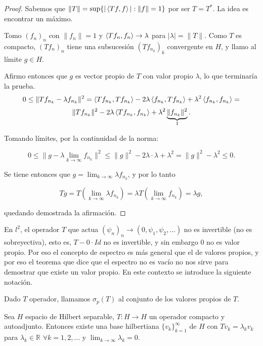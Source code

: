 \begin{proof}
  Sabemos que $\|T\|=\sup \{|\left\langle Tf,f\right\rangle|:\|f\|=1\}$ por ser $T=T^*$. La
  idea es encontrar un máximo.

  Tomo $(f_n)_n$ con $\|f_n\|=1$ y $\left\langle Tf_n,f_n\right\rangle\to \lambda$ para
  $|\lambda|=\|T\|$. Como $T$ es compacto, $(Tf_n)_n$ tiene una subsucesión
  $(Tf_{n_k})_k$ convergente en $H$, y llamo al límite $g\in H$.

  Afirmo entonces que $g$ es vector propio de $T$ con valor propio $\lambda$, lo
  que terminaría la prueba.
  \[
  0\le \|Tf_{n_k}-\lambda f_{n_k}\|^2 =
  \left\langle Tf_{n_k},Tf_{n_k}\right\rangle-2\lambda\left\langle f_{n_k},Tf_{n_k}\right\rangle+\lambda^2
  \left\langle f_{n_k},f_{n_k}\right\rangle=
  \] 
  \[
  \|Tf_{n_k}\|^2-2\lambda\left\langle Tf_{n_k},f_{n_k}\right\rangle + \lambda^2
  \underbrace{\|f_{n_k}\|^2}_{1}
  .\] 

  Tomando límites, por la continuidad de la norma:

  \[
  0\le \|g-\lambda \lim_{k \to \infty} f_{n_k}\|^2 \le 
  \|g\|^2-2\lambda\cdot \lambda + \lambda^2 =
  \|g\|^2 - \lambda^2 \le 0
  .\] 
  
  Se tiene entonces que $g=\lim_{k \to \infty} \lambda f_{n_k}$, y por lo tanto

  \[
  Tg = T(\lim_{k \to \infty} \lambda f_{n_k})=\lambda T(\lim_{k \to \infty}
  f_{n_k})=\lambda g
  ,\] 

  quedando demostrada la afirmación.

\end{proof}

\begin{remark}
  En $l^2$, el operador $T$ que actua $(\psi_n)_n\to (0,\psi_1,\psi_2,\ldots)$
  no es invertible (no es sobreyectiva), esto es, $T-0\cdot Id$ no es
  invertible, y sin embargo $0$ no es valor propio. Por eso el concepto de
  espectro es más general que el de valores propios, y por eso el teorema que
  dice que el espectro no es vacío no nos sirve para demostrar que existe un
  valor propio. En este contexto se introduce la siguiente notación.
\end{remark}

\begin{definition}
  Dado $T$ operador, llamamos $\sigma_p(T)$ al conjunto de los valores propios
  de $T$.
\end{definition}

\begin{theorem}
  \label{th:hilbert-schmidt}
  Sea $H$ espacio de Hilbert separable, $T:H\to H$ un operador compacto y
  autoadjunto. Entonces existe una base hilbertiana $\{v_k\}_{k=1}^\infty$ de $H$ 
  con $Tv_k=\lambda_k v_k$ para $\lambda_k\in \mathbb{R}$ $\forall k=1,2,\ldots$ y
  $\lim_{k \to \infty} \lambda_k=0$.
\end{theorem}

